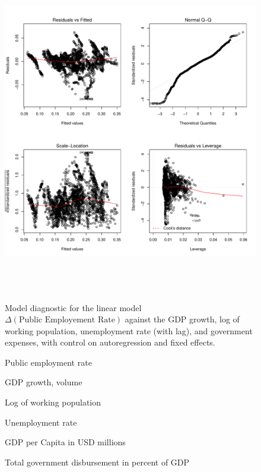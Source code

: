 \documentclass[a4paper, 10pt]{article}
\newcommand{\insertplot}[2]{
  \begin{figure}[!ht]
    \centering
    
    \caption{#2}
  \end{figure}
}
\begin{document}
%     
\begin{landscape}

  \begin{figure}
    \centering
    \includegraphics[height=15cm]{model_diagnostic_quarterly}
    \caption{Model diagnostic for the linear model $\Delta( \textrm{Public
        Employement Rate})$ against the GDP growth, log of working
      population, unemployment rate (with lag), and government expenses, with
      control on autoregression and fixed effects.}
   \end{figure}

  \insertplot{simple_model_quarterly_egr.tex}{Public employment rate}
  \insertplot{simple_model_quarterly_gdpv_annpct.tex}{GDP growth, volume}
  \insertplot{simple_model_quarterly_lpop_interpolated.tex}{Log of working population}
  \insertplot{simple_model_quarterly_unr.tex}{Unemployment rate}
  \insertplot{simple_model_quarterly_gdp_per_capita_interpolated.tex}{GDP per
    Capita in USD millions}
  \insertplot{simple_model_quarterly_ypgtq_interpolated.tex}{Total government disbursement in
    percent of GDP}
\end{landscape}
\end{document}
